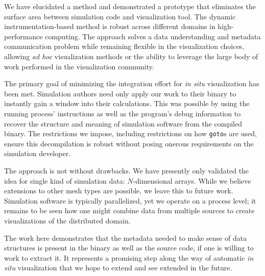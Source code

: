
We have elucidated a method and demonstrated a prototype that
eliminates the surface area between simulation code and visualization
tool.  The dynamic instrumentation-based method is robust across
different domains in high-performance computing.  The approach solves a
data understanding and metadata communication problem while remaining
flexible in the visualization choices, allowing \textit{ad hoc}
visualization methods or the ability to leverage the large body of work
performed in the visualization community.

The primary goal of minimizing the integration effort for \textit{in
situ} visualization has been met.  Simulation authors need only
apply our work to their binary to instantly gain a window into their
calculations.  This was possible by using the running process'
instructions as well as the program's debug information to recover the
structure and meaning of simulation software from the compiled binary.
The restrictions we impose, including restrictions on how
\texttt{goto}s are used, ensure this decompilation is robust without
posing onerous requirements on the simulation developer.


The approach is not without drawbacks.  We have presently only
validated the idea for single kind of simulation data: $N$-dimensional
arrays.  While we believe extensions to other mesh types are possible,
we leave this to future work.  Simulation software is typically
parallelized, yet we operate on a process level; it remains to be
seen how one might combine data from multiple sources to create
visualizations of the distributed domain.

The work here demonstrates that the metadata needed to make sense of
data structures is present in the binary as well as the source code, if
one is willing to work to extract it.  It represents a promising step
along the way of automatic \textit{in situ} visualization that we hope
to extend and see extended in the future.

